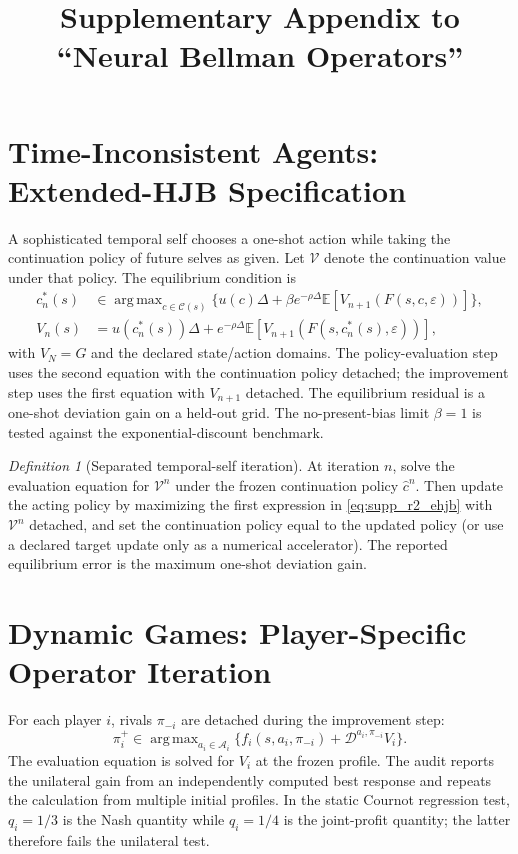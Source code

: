\documentclass[ecta]{econsocart}
\theoremstyle{plain}
\theoremstyle{remark}
\newtheorem{definition}{Definition}
\newcommand{\E}{\mathbb{E}}
\DeclareMathOperator*{\argmax}{arg\,max}
\newcommand{\diffop}{\mathcal{D}}
\begin{document}
\begin{frontmatter}
\title{Supplementary Appendix to ``Neural Bellman Operators''}
\end{frontmatter}
\setcounter{equation}{0}

\section{Time-Inconsistent Agents: Extended-HJB Specification}
A sophisticated temporal self chooses a one-shot action while taking the continuation policy of future selves as given. Let $\mathcal V$ denote the continuation value under that policy. The equilibrium condition is
\begin{align}
 c_n^*(s)&\in\argmax_{c\in\mathcal C(s)}\{u(c)\Delta+\beta e^{-\rho\Delta}\E[V_{n+1}(F(s,c,\varepsilon))]\},\\
 V_n(s)&=u(c_n^*(s))\Delta+e^{-\rho\Delta}\E[V_{n+1}(F(s,c_n^*(s),\varepsilon))],
\label{eq:supp_r2_ehjb}
\end{align}
with $V_N=G$ and the declared state/action domains. The policy-evaluation step uses the second equation with the continuation policy detached; the improvement step uses the first equation with $V_{n+1}$ detached. The equilibrium residual is a one-shot deviation gain on a held-out grid. The no-present-bias limit $\beta=1$ is tested against the exponential-discount benchmark.

\begin{definition}[Separated temporal-self iteration]
At iteration $n$, solve the evaluation equation for $\mathcal V^n$ under the frozen continuation policy $\hat c^n$. Then update the acting policy by maximizing the first expression in \eqref{eq:supp_r2_ehjb} with $\mathcal V^n$ detached, and set the continuation policy equal to the updated policy (or use a declared target update only as a numerical accelerator). The reported equilibrium error is the maximum one-shot deviation gain.
\end{definition}

\section{Dynamic Games: Player-Specific Operator Iteration}
For each player $i$, rivals $\pi_{-i}$ are detached during the improvement step:
\begin{equation}
\pi_i^{+}\in\argmax_{a_i\in\mathcal A_i}\{f_i(s,a_i,\pi_{-i})+\diffop^{a_i,\pi_{-i}}V_i\}.
\label{eq:supp_r2_game}
\end{equation}
The evaluation equation is solved for $V_i$ at the frozen profile. The audit reports the unilateral gain from an independently computed best response and repeats the calculation from multiple initial profiles. In the static Cournot regression test, $q_i=1/3$ is the Nash quantity while $q_i=1/4$ is the joint-profit quantity; the latter therefore fails the unilateral test.
\end{document}
